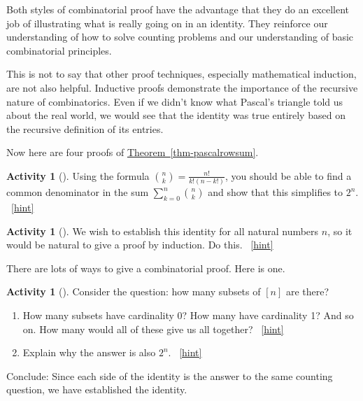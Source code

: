 \documentclass[10pt,]{book}
\theoremstyle{plain}
\theoremstyle{definition}
\theoremstyle{definition}
\theoremstyle{definition}
\newtheorem{activity}[project]{Activity}
\numberwithin{equation}{chapter}
\begin{document}
\par
\hypertarget{p-574}{}%
Both styles of combinatorial proof have the advantage that they do an excellent job of illustrating what is really going on in an identity.  They reinforce our understanding of how to solve counting problems and our understanding of basic combinatorial principles.%
\par
\hypertarget{p-575}{}%
This is not to say that other proof techniques, especially mathematical induction, are not also helpful.  Inductive proofs demonstrate the importance of the recursive nature of combinatorics.  Even if we didn't know what Pascal's triangle told us about the real world, we would see that the identity was true entirely based on the recursive definition of its entries.%
\par
\hypertarget{p-576}{}%
Now here are four proofs of \hyperref[thm-pascalrowsum]{Theorem~\ref{thm-pascalrowsum}}.%
\begin{activity}[]\label{act-pascalrowsum-alg}
\hypertarget{p-577}{}%
Using the formula \(\binom{n}{k} = \frac{n!}{k!(n-k!)}\), you should be able to find a common denominator in the sum \(\sum_{k=0}^n \binom{n}{k}\) and show that this simplifies to \(2^n\).%
~\hfill{\tiny\hyperlink{a-76}{[hint]}\hypertarget{q-76}{}}\end{activity}
\begin{activity}[]\label{activity-70}
\hypertarget{p-579}{}%
We wish to establish this identity for all natural numbers \(n\), so it would be natural to give a proof by induction.  Do this.%
~\hfill{\tiny\hyperlink{a-77}{[hint]}\hypertarget{q-77}{}}\end{activity}
\hypertarget{p-581}{}%
There are lots of ways to give a combinatorial proof.  Here is one.%
\begin{activity}[]\label{activity-pascalrow-dc}
\hypertarget{p-582}{}%
Consider the question: how many subsets of \([n]\) are there?%
\begin{enumerate}[font=\bfseries,label=(\alph*),ref=\alph*]
\item\label{task-111} \hypertarget{p-583}{}%
How many subsets have cardinality 0?  How many have cardinality 1?  And so on.  How many would all of these give us all together?%
~\hfill{\tiny\hyperlink{a-78.a}{[hint]}\hypertarget{q-78.a}{}}\item\label{task-112} \hypertarget{p-585}{}%
Explain why the answer is also \(2^n\).%
~\hfill{\tiny\hyperlink{a-78.b}{[hint]}\hypertarget{q-78.b}{}}\end{enumerate}
\bigbreak
\hypertarget{p-587}{}%
Conclude: Since each side of the identity is the answer to the same counting question, we have established the identity.%
\end{activity}
\end{document}
